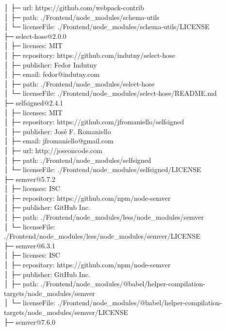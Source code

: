 │  ├─ url: https://github.com/webpack-contrib\\
│  ├─ path: ./Frontend/node\_modules/schema-utils\\
│  └─ licenseFile: ./Frontend/node\_modules/schema-utils/LICENSE\\
├─ select-hose@2.0.0\\
│  ├─ licenses: MIT\\
│  ├─ repository: https://github.com/indutny/select-hose\\
│  ├─ publisher: Fedor Indutny\\
│  ├─ email: fedor@indutny.com\\
│  ├─ path: ./Frontend/node\_modules/select-hose\\
│  └─ licenseFile: ./Frontend/node\_modules/select-hose/README.md\\
├─ selfsigned@2.4.1\\
│  ├─ licenses: MIT\\
│  ├─ repository: https://github.com/jfromaniello/selfsigned\\
│  ├─ publisher: José F. Romaniello\\
│  ├─ email: jfromaniello@gmail.com\\
│  ├─ url: http://joseoncode.com\\
│  ├─ path: ./Frontend/node\_modules/selfsigned\\
│  └─ licenseFile: ./Frontend/node\_modules/selfsigned/LICENSE\\
├─ semver@5.7.2\\
│  ├─ licenses: ISC\\
│  ├─ repository: https://github.com/npm/node-semver\\
│  ├─ publisher: GitHub Inc.\\
│  ├─ path: ./Frontend/node\_modules/less/node\_modules/semver\\
│  └─ licenseFile: ./Frontend/node\_modules/less/node\_modules/semver/LICENSE\\
├─ semver@6.3.1\\
│  ├─ licenses: ISC\\
│  ├─ repository: https://github.com/npm/node-semver\\
│  ├─ publisher: GitHub Inc.\\
│  ├─ path: ./Frontend/node\_modules/@babel/helper-compilation-targets/node\_modules/semver\\
│  └─ licenseFile: ./Frontend/node\_modules/@babel/helper-compilation-targets/node\_modules/semver/LICENSE\\
├─ semver@7.6.0\\

